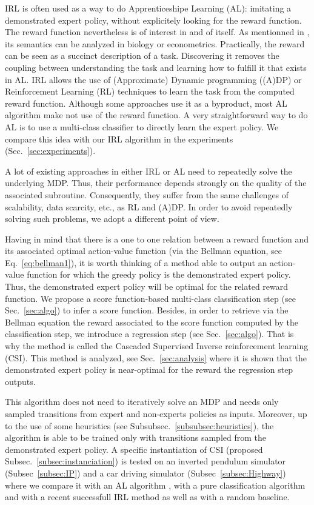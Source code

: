 \documentclass[smallextended]{svjour3}
\begin{document}
IRL is often used as a way to do Apprenticeshipe Learning (AL): imitating a demonstrated expert policy, without explicitely looking for the reward function. The reward function nevertheless is of interest in and of itself. As mentionned in \cite{ng2000algorithms}, its semantics can be analyzed in biology or econometrics. Practically, the reward can be seen as a succinct description of a task. Discovering it removes the coupling between understanding the task and learning how to fulfill it that exists in AL. IRL allows the use of (Approximate) Dynamic programming ((A)DP) or Reinforcement Learning (RL) techniques to learn the task from the computed reward function. Although some approaches use it as a byproduct, most AL algorithm make not use of the reward function. A very straightforward way to do AL is to use a multi-class classifier to directly learn the expert policy. We compare this idea with our IRL algorithm in the experiments (Sec.~\ref{sec:experiments}).

A lot of existing approaches in either IRL or AL need to repeatedly solve the underlying MDP. Thus, their performance depends strongly on the quality of the associated subroutine. Consequently, they suffer from the same challenges of scalability, data scarcity, etc., as RL and (A)DP. In order to avoid repeatedly solving such problems, we adopt a different point of view.

Having in mind that there is a one to one relation between a reward function and its associated optimal action-value function (via the Bellman equation, see Eq.~\eqref{eq:bellman1}), it is worth thinking of a method able to output an action-value function for which the greedy policy is the demonstrated expert policy. Thus, the demonstrated expert policy will be optimal for the related reward function. We propose a score function-based multi-class classification step (see Sec.~\ref{sec:algo}) to infer a score function. Besides, in order to retrieve via the Bellman equation the reward associated to the score function computed by the classification step, we introduce a regression step (see Sec.~\ref{sec:algo}). That is why the method is called the Cascaded Supervised Inverse reinforcement learning (CSI). This method is analyzed, see Sec.~\ref{sec:analysis} where it is shown that the demonstrated expert policy is near-optimal for the reward the regression step outputs.

This algorithm does not need to iteratively solve an MDP and needs only sampled transitions from expert and non-experts policies as inputs. Moreover, up to the use of some heuristics (see Subsubsec.~\ref{subsubsec:heuristics}), the algorithm is able to be trained only with transitions sampled from the demonstrated expert policy. A specific instantiation of CSI (proposed Subsec.~\ref{subsec:instanciation}) is tested on an inverted pendulum simulator (Subsec~\ref{subsec:IP}) and a car driving simulator (Subsec~\ref{subsec:Highway}) where we compare it with an AL algorithm \cite{abbeel2004apprenticeship}, with a pure classification algorithm \cite{taskar2005learning} and with a recent successfull IRL method \cite{klein2012scirl} as well as with a random baseline.
\end{document}
